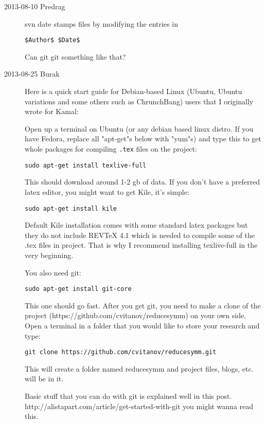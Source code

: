 \begin{description}
\item[2013-08-10 Predrag] svn date stamps files by modifying the entries in
\begin{verbatim}
$Author$ $Date$
\end{verbatim}
Can git git something like that?

\item[2013-08-25 Burak] Here is a quick start guide for Debian-based Linux (Ubuntu, Ubuntu variations and some others such as ChrunchBang) users that I originally wrote for Kamal:

Open up a terminal on Ubuntu (or any debian based linux distro. If you have Fedora, replace all "apt-get"s below with "yum"s) and type this to get whole packages for compiling \texttt{.tex} files on the project:

\begin{verbatim}
sudo apt-get install texlive-full
\end{verbatim}

This should download around 1-2 gb of data. If you don't have a preferred latex editor, you might want to get Kile, it's simple:

\begin{verbatim}
sudo apt-get install kile
\end{verbatim}

Default Kile installation comes with some standard latex packages but they do not include REVTeX 4.1 which is needed to compile some of the .tex files in project. That is why I recommend installing texlive-full in the very beginning.

You also need git:

\begin{verbatim}
sudo apt-get install git-core
\end{verbatim}

This one should go fast. After you get git, you need to make a clone of the project (https://github.com/cvitanov/reducesymm) on your own side. Open a terminal in a folder that you would like to store your research and type:

\begin{verbatim}
git clone https://github.com/cvitanov/reducesymm.git
\end{verbatim}

This will create a folder named reducesymm and project files, blogs, etc. will be in it.

Basic stuff that you can do with git is explained well in this post. http://alistapart.com/article/get-started-with-git you might wanna read this.


\end{description}
